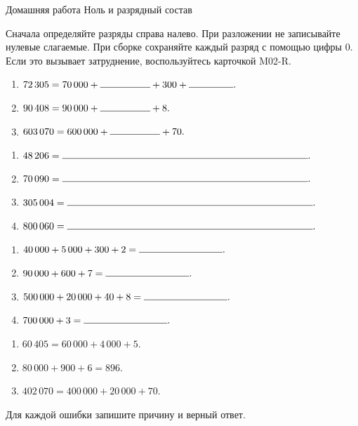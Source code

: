 \worksheettitle
  {Домашняя работа}
  { Ноль и разрядный состав}

\studentnameblock

\begin{notebox}[Маршрут]
  Сначала определяйте разряды справа налево. При разложении не записывайте
  нулевые слагаемые. При сборке сохраняйте каждый разряд с помощью цифры \(0\).
  Если это вызывает затруднение, воспользуйтесь карточкой M02-R.
\end{notebox}

\begin{practicebox}
  \begin{enumerate}[label=\textbf{\arabic*.}]
    \item \(72\,305=70\,000+\answerblank[18mm]+300+\answerblank[16mm].\)
    \item \(90\,408=90\,000+\answerblank[18mm]+8.\)
    \item \(603\,070=600\,000+\answerblank[18mm]+70.\)
  \end{enumerate}
\end{practicebox}

\begin{practicebox}
  \begin{enumerate}[label=\textbf{\arabic*.}]
    \item \(48\,206=\answerblank[88mm].\)
    \item \(70\,090=\answerblank[88mm].\)
    \item \(305\,004=\answerblank[88mm].\)
    \item \(800\,060=\answerblank[88mm].\)
  \end{enumerate}
\end{practicebox}

\begin{practicebox}
  \begin{enumerate}[label=\textbf{\arabic*.}]
    \item \(40\,000+5\,000+300+2=\answerblank[30mm].\)
    \item \(90\,000+600+7=\answerblank[30mm].\)
    \item \(500\,000+20\,000+40+8=\answerblank[30mm].\)
    \item \(700\,000+3=\answerblank[30mm].\)
  \end{enumerate}
\end{practicebox}

\begin{warningbox}
  \begin{enumerate}[label=\textbf{\arabic*.}]
    \item \(60\,405=60\,000+4\,000+5.\)
    \item \(80\,000+900+6=896.\)
    \item \(402\,070=400\,000+20\,000+70.\)
  \end{enumerate}
  Для каждой ошибки запишите причину и верный ответ.
\end{warningbox}


